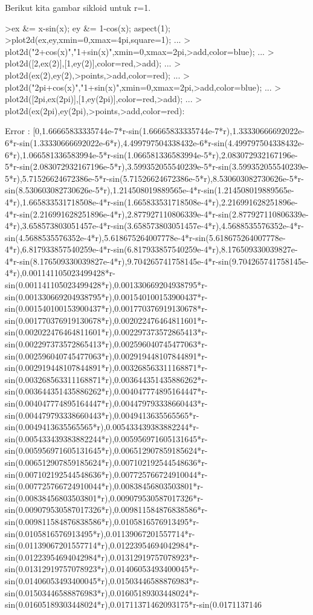 \documentclass[a4paper,10pt]{article}
\begin{document}
\begin{eulernotebook}
\begin{eulercomment}
\begin{eulercomment}
\begin{eulercomment}
\begin{eulercomment}
\begin{euleroutput}
\end{euleroutput}
\begin{eulercomment}
Berikut kita gambar sikloid untuk r=1.
\end{eulercomment}
\begin{eulerprompt}
>ex &= x-sin(x); ey &= 1-cos(x); aspect(1);
>plot2d(ex,ey,xmin=0,xmax=4pi,square=1); ...
>  plot2d("2+cos(x)","1+sin(x)",xmin=0,xmax=2pi,>add,color=blue); ...
>  plot2d([2,ex(2)],[1,ey(2)],color=red,>add); ...
>  plot2d(ex(2),ey(2),>points,>add,color=red); ...
>  plot2d("2pi+cos(x)","1+sin(x)",xmin=0,xmax=2pi,>add,color=blue); ...
>  plot2d([2pi,ex(2pi)],[1,ey(2pi)],color=red,>add);  ...
>  plot2d(ex(2pi),ey(2pi),>points,>add,color=red):
\end{eulerprompt}
\begin{euleroutput}
  Error : [0,1.66665833335744e-7*r-sin(1.66665833335744e-7*r),1.33330666692022e-6*r-sin(1.33330666692022e-6*r),4.499797504338432e-6*r-sin(4.499797504338432e-6*r),1.066581336583994e-5*r-sin(1.066581336583994e-5*r),2.083072932167196e-5*r-sin(2.083072932167196e-5*r),3.599352055540239e-5*r-sin(3.599352055540239e-5*r),5.71526624672386e-5*r-sin(5.71526624672386e-5*r),8.530603082730626e-5*r-sin(8.530603082730626e-5*r),1.214508019889565e-4*r-sin(1.214508019889565e-4*r),1.665833531718508e-4*r-sin(1.665833531718508e-4*r),2.216991628251896e-4*r-sin(2.216991628251896e-4*r),2.877927110806339e-4*r-sin(2.877927110806339e-4*r),3.658573803051457e-4*r-sin(3.658573803051457e-4*r),4.5688535576352e-4*r-sin(4.5688535576352e-4*r),5.618675264007778e-4*r-sin(5.618675264007778e-4*r),6.817933857540259e-4*r-sin(6.817933857540259e-4*r),8.176509330039827e-4*r-sin(8.176509330039827e-4*r),9.704265741758145e-4*r-sin(9.704265741758145e-4*r),0.001141105023499428*r-sin(0.001141105023499428*r),0.001330669204938795*r-sin(0.001330669204938795*r),0.001540100153900437*r-sin(0.001540100153900437*r),0.001770376919130678*r-sin(0.001770376919130678*r),0.002022476464811601*r-sin(0.002022476464811601*r),0.002297373572865413*r-sin(0.002297373572865413*r),0.002596040745477063*r-sin(0.002596040745477063*r),0.002919448107844891*r-sin(0.002919448107844891*r),0.003268563311168871*r-sin(0.003268563311168871*r),0.003644351435886262*r-sin(0.003644351435886262*r),0.004047774895164447*r-sin(0.004047774895164447*r),0.004479793338660443*r-sin(0.004479793338660443*r),0.0049413635565565*r-sin(0.0049413635565565*r),0.005433439383882244*r-sin(0.005433439383882244*r),0.005956971605131645*r-sin(0.005956971605131645*r),0.006512907859185624*r-sin(0.006512907859185624*r),0.007102192544548636*r-sin(0.007102192544548636*r),0.007725766724910044*r-sin(0.007725766724910044*r),0.00838456803503801*r-sin(0.00838456803503801*r),0.009079530587017326*r-sin(0.009079530587017326*r),0.009811584876838586*r-sin(0.009811584876838586*r),0.0105816576913495*r-sin(0.0105816576913495*r),0.01139067201557714*r-sin(0.01139067201557714*r),0.01223954694042984*r-sin(0.01223954694042984*r),0.01312919757078923*r-sin(0.01312919757078923*r),0.01406053493400045*r-sin(0.01406053493400045*r),0.01503446588876983*r-sin(0.01503446588876983*r),0.01605189303448024*r-sin(0.01605189303448024*r),0.01711371462093175*r-sin(0.0171137146
\end{euleroutput}
\end{eulercomment}
\end{eulercomment}
\end{eulercomment}
\end{eulercomment}
\end{eulernotebook}
\end{document}
